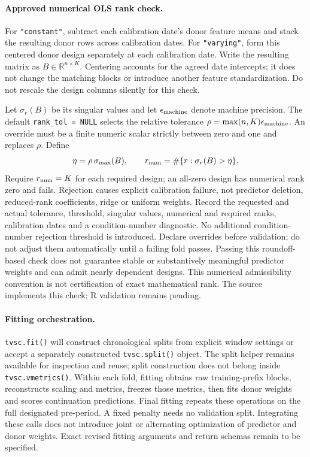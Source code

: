 \documentclass[11pt]{article}
\begin{document}
\paragraph{Approved numerical OLS rank check.}
For \texttt{"constant"}, subtract each calibration date's donor feature
means and stack the resulting donor rows across calibration dates. For
\texttt{"varying"}, form this centered donor design separately at each
calibration date. Write the resulting matrix as $B\in\mathbb R^{n\times K}$.
Centering accounts for the agreed date intercepts; it does not change the
matching blocks or introduce another feature standardization. Do not
rescale the design columns silently for this check.

Let $\sigma_r(B)$ be its singular values and let $\epsilon_{\rm machine}$
denote machine precision. The default \texttt{rank\_tol = NULL} selects
the relative tolerance $\rho=\max(n,K)\epsilon_{\rm machine}$. An override
must be a finite numeric scalar strictly between zero and one and replaces
$\rho$. Define
\[
 \eta=\rho\,\sigma_{\max}(B),\qquad
 r_{\rm num}=\#\{r:\sigma_r(B)>\eta\}.
\]
Require $r_{\rm num}=K$ for each required design; an all-zero design
has numerical rank zero and fails. Rejection causes explicit calibration
failure, not predictor deletion, reduced-rank coefficients, ridge or
uniform weights. Record the requested and actual tolerance, threshold,
singular values, numerical and required ranks, calibration dates and a
condition-number diagnostic. No additional condition-number rejection
threshold is introduced. Declare overrides before validation; do not
adjust them automatically until a failing fold passes. Passing this
roundoff-based check does not guarantee stable or substantively meaningful
predictor weights and can admit nearly dependent designs. This numerical
admissibility convention is not certification of exact mathematical rank.
The source implements this check; R validation remains pending.

\paragraph{Fitting orchestration.}
\texttt{tvsc.fit()} will construct chronological splits from explicit
window settings or accept a separately constructed \texttt{tvsc.split()}
object. The split helper remains available for inspection and reuse;
split construction does not belong inside \texttt{tvsc.vmetrics()}.
Within each fold, fitting obtains raw training-prefix blocks, reconstructs
scaling and metrics, freezes those metrics, then fits donor weights and
scores continuation predictions. Final fitting repeats these operations
on the full designated pre-period. A fixed penalty needs no validation
split. Integrating these calls does not introduce joint or alternating
optimization of predictor and donor weights. Exact revised fitting
arguments and return schemas remain to be specified.
\end{document}
